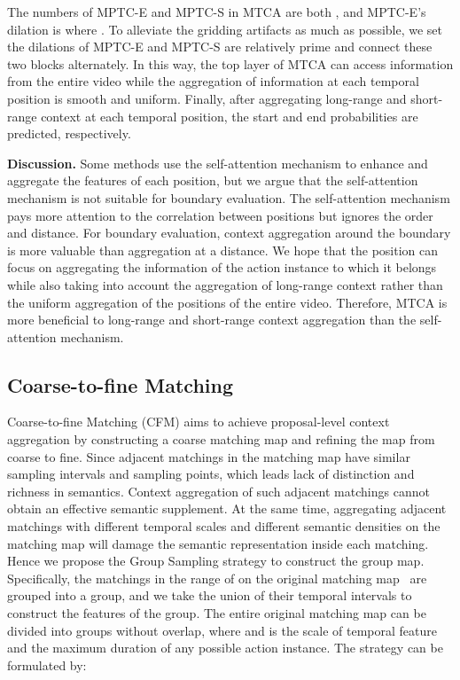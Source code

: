 \documentclass[letterpaper]{article} \usepackage{aaai22}  \usepackage{times}  \usepackage{helvet}  \usepackage{courier}  \usepackage[hyphens]{url}  \usepackage{graphicx} \urlstyle{rm} \def\UrlFont{\rm}  \usepackage{natbib}  \usepackage{caption} \DeclareCaptionStyle{ruled}{labelfont=normalfont,labelsep=colon,strut=off} \frenchspacing  \setlength{\pdfpagewidth}{8.5in}  \setlength{\pdfpageheight}{11in}  \usepackage{algorithm}
\begin{document}
The numbers of MPTC-E and MPTC-S in MTCA are both , and MPTC-E's dilation  is  where .
To alleviate the gridding artifacts as much as possible, we set the dilations of MPTC-E and MPTC-S are relatively prime and connect these two blocks alternately.
In this way, the top layer of MTCA can access information from the entire video while the aggregation of information at each temporal position is smooth and uniform.
Finally, after aggregating long-range and short-range context at each temporal position, the start and end probabilities are predicted, respectively.











\noindent \textbf{Discussion.}
Some methods use the self-attention mechanism to enhance and aggregate the features of each position, but we argue that the self-attention mechanism is not suitable for boundary evaluation.
The self-attention mechanism pays more attention to the correlation between positions but ignores the order and distance.
For boundary evaluation, context aggregation around the boundary is more valuable than aggregation at a distance.
We hope that the position can focus on aggregating the information of the action instance to which it belongs while also taking into account the aggregation of long-range context rather than the uniform aggregation of the positions of the entire video.
Therefore, MTCA is more beneficial to long-range and short-range context aggregation than the self-attention mechanism.

\subsection{Coarse-to-fine Matching}
Coarse-to-fine Matching (CFM) aims to achieve proposal-level context aggregation by constructing a coarse matching map and refining the map from coarse to fine.
Since adjacent matchings in the matching map have similar sampling intervals and sampling points, which leads lack of distinction and richness in semantics.
Context aggregation of such adjacent matchings cannot obtain an effective semantic supplement.
At the same time, aggregating adjacent matchings with different temporal scales and different semantic densities on the matching map will damage the semantic representation inside each matching.
Hence we propose the Group Sampling strategy to construct the group map.
Specifically, the matchings in the range of  on the original matching map~\cite{bmn} are grouped into a group, and we take the union of their temporal intervals to construct the features of the group.
The entire original matching map can be divided into  groups without overlap, where  and  is the scale of temporal feature and the maximum duration of any possible action instance.
The strategy can be formulated by:
\end{document}
